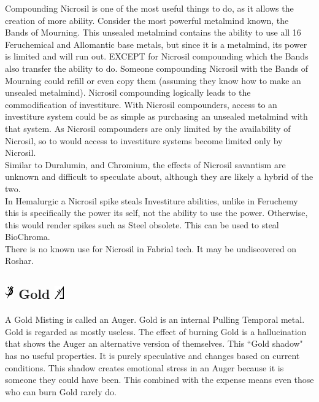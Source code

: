 \documentclass[conference]{IEEEtran}
\begin{document}
Compounding Nicrosil is one of the most useful things to do, as it allows the creation of more ability.  Consider the most powerful metalmind known, the Bands of Mourning.  This unsealed metalmind contains the ability to use all 16 Feruchemical and Allomantic base metals, but since it is a metalmind, its power is limited and will run out.  EXCEPT for Nicrosil compounding which the Bands also transfer the ability to do.  Someone compounding Nicrosil with the Bands of Mourning could refill or even copy them (assuming they know how to make an unsealed metalmind).  Nicrosil compounding logically leads to the commodification of investiture.  With Nicrosil compounders, access to an investiture system could be as simple as purchasing an unsealed metalmind with that system.  As Nicrosil compounders are only limited by the availability of Nicrosil, so to would access to investiture systems become limited only by Nicrosil. \\

Similar to Duralumin, and Chromium, the effects of Nicrosil savantism are unknown and difficult to speculate about, although they are likely a hybrid of the two.\\

In Hemalurgic a Nicrosil spike steals Investiture abilities, unlike in Feruchemy this is specifically the power its self, not the ability to use the power.  Otherwise, this would render spikes such as Steel obsolete.  This can be used to steal BioChroma.\\

There is no known use for Nicrosil in Fabrial tech.  It may be undiscovered on Roshar.
\subsection*{\includegraphics[height=1em]{images/Gold.png}  Gold \includegraphics[height=1em]{images/Gold_(Feruchemy).png}}
A Gold Misting is called an Auger.  Gold is an internal Pulling Temporal metal.  Gold is regarded as mostly useless.  The effect of burning Gold is a hallucination that shows the Auger an alternative version of themselves.  This ``Gold shadow" has no useful properties.  It is purely speculative and changes based on current conditions.  This shadow creates emotional stress in an Auger because it is someone they could have been.  This combined with the expense means even those who can burn Gold rarely do.\\
\end{document}
